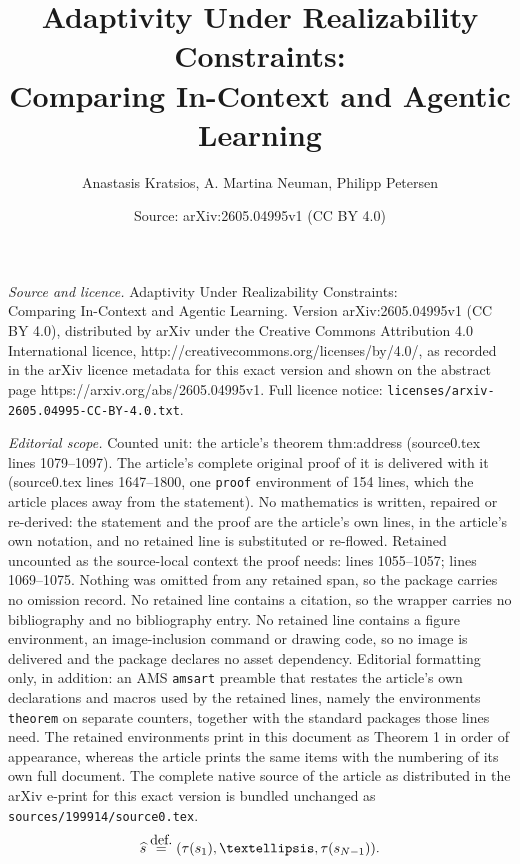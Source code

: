 \documentclass[10pt,a4paper]{amsart}
\title{Adaptivity Under Realizability Constraints:\\ Comparing In-Context and Agentic Learning}
\author{Anastasis Kratsios, A. Martina Neuman, Philipp Petersen}
\date{Source: arXiv:2605.04995v1 (CC BY 4.0)}
\newcommand{\eqdef }{\ensuremath{\stackrel{\mbox{\upshape\tiny def.}}{=}}}
\begin{document}
\maketitle

\noindent\emph{Source and licence.} Adaptivity Under Realizability Constraints:\\ Comparing In-Context and Agentic Learning. Version arXiv:2605.04995v1 (CC BY 4.0), distributed by arXiv under the Creative Commons Attribution 4.0 International licence, http://creativecommons.org/licenses/by/4.0/, as recorded in the arXiv licence metadata for this exact version and shown on the abstract page https://arxiv.org/abs/2605.04995v1. Full licence notice: \texttt{licenses/arxiv-2605.04995-CC-BY-4.0.txt}.\par\smallskip

\noindent\textit{Editorial scope.} Counted unit: the article's theorem thm:address (source0.tex lines 1079--1097). The article's complete original proof of it is delivered with it (source0.tex lines 1647--1800, one \texttt{proof} environment of 154 lines, which the article places away from the statement). No mathematics is written, repaired or re-derived: the statement and the proof are the article's own lines, in the article's own notation, and no retained line is substituted or re-flowed.  Retained uncounted as the source-local context the proof needs: lines 1055--1057; lines 1069--1075.  Nothing was omitted from any retained span, so the package carries no omission record.  No retained line contains a citation, so the wrapper carries no bibliography and no bibliography entry.  No retained line contains a figure environment, an image-inclusion command or drawing code, so no image is delivered and the package declares no asset dependency.  Editorial formatting only, in addition: an AMS \texttt{amsart} preamble that restates the article's own declarations and macros used by the retained lines, namely the environments \texttt{theorem} on separate counters, together with the standard packages those lines need.  The retained environments print in this document as Theorem 1 in order of appearance, whereas the article prints the same items with the numbering of its own full document.  The complete native source of the article as distributed in the arXiv e-print for this exact version is bundled unchanged as \texttt{sources/199914/source0.tex}.
\begin{equation} \label{hats}
    \widehat s\eqdef  (\tau(s_1),\dots,\tau(s_{N-1})).
\end{equation}
\end{document}
